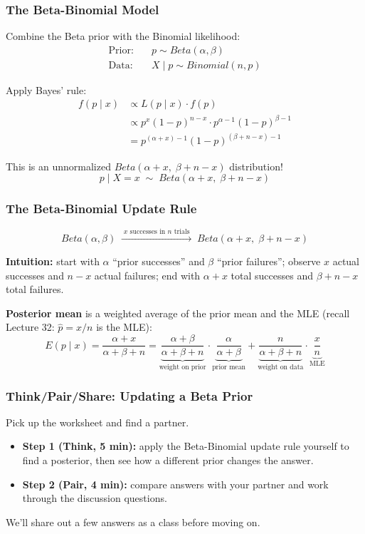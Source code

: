 \documentclass[slidestop,compress,mathserif]{beamer}
\begin{document}
\begin{frame}
    \frametitle{The Beta-Binomial Model}
    Combine the Beta prior with the Binomial likelihood:
    \begin{align*}
    \text{Prior:} \quad & p \sim Beta(\alpha,\beta) \\
    \text{Data:} \quad & X\mid p \sim Binomial(n,p)
    \end{align*}
    \pause

    \medskip
    Apply Bayes' rule:
    \begin{align*}
    f(p\mid x) &\propto L(p \mid x)\cdot f(p) \\
    &\propto p^x(1-p)^{n-x}\cdot p^{\alpha-1}(1-p)^{\beta-1} \\
    &= p^{(\alpha+x)-1}(1-p)^{(\beta+n-x)-1}
    \end{align*}
    \pause

    \medskip
    This is an unnormalized $Beta(\alpha+x,\;\beta+n-x)$ distribution!
    \[
    \boxed{p \mid X=x \;\sim\; Beta(\alpha+x,\;\beta+n-x)}
    \]
\end{frame}

\begin{frame}
    \frametitle{The Beta-Binomial Update Rule}
    \[
    Beta(\alpha,\beta) \;\xrightarrow{\;x\text{ successes in }n\text{ trials}\;}\; Beta(\alpha+x,\;\beta+n-x)
    \]
    \pause

    \medskip
    \textbf{Intuition:} start with $\alpha$ ``prior successes'' and $\beta$ ``prior failures''; observe $x$ actual successes and $n-x$ actual failures; end with $\alpha+x$ total successes and $\beta+n-x$ total failures.
    \pause

    \medskip
    \textbf{Posterior mean} is a weighted average of the prior mean and the MLE (recall Lecture 32: $\hat{p}=x/n$ is the MLE):
    \[
    E(p\mid x) = \frac{\alpha+x}{\alpha+\beta+n} = \underbrace{\frac{\alpha+\beta}{\alpha+\beta+n}}_{\text{weight on prior}} \cdot \underbrace{\frac{\alpha}{\alpha+\beta}}_{\text{prior mean}} + \underbrace{\frac{n}{\alpha+\beta+n}}_{\text{weight on data}} \cdot \underbrace{\frac{x}{n}}_{\text{MLE}}
    \]
\end{frame}

\begin{frame}
    \frametitle{Think/Pair/Share: Updating a Beta Prior}
    Pick up the worksheet and find a partner.
    \medskip
    \begin{itemize}
        \item \textbf{Step 1 (Think, 5 min):} apply the Beta-Binomial update rule yourself to find a posterior, then see how a different prior changes the answer.
        \item \textbf{Step 2 (Pair, 4 min):} compare answers with your partner and work through the discussion questions.
    \end{itemize}
    \medskip
    We'll share out a few answers as a class before moving on.
\end{frame}
\end{document}
